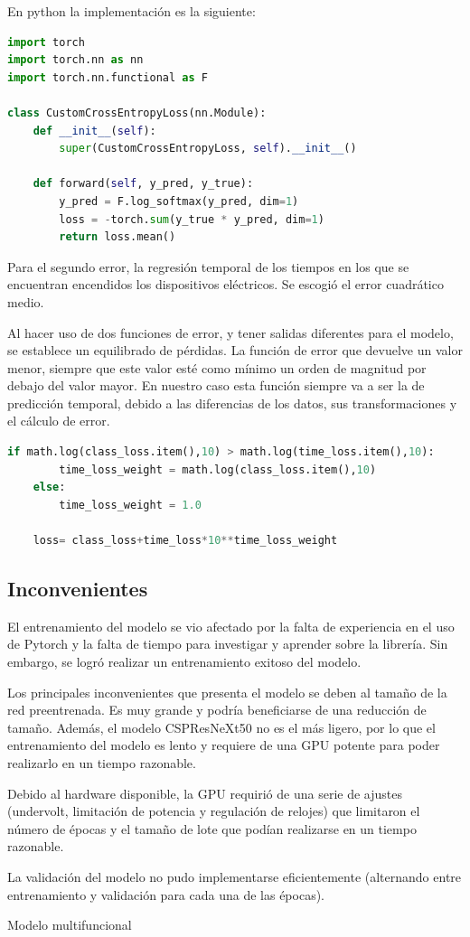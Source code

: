 En python la implementación es la siguiente: 
\begin{lstlisting}[language=python]
import torch
import torch.nn as nn
import torch.nn.functional as F

class CustomCrossEntropyLoss(nn.Module):
    def __init__(self):
        super(CustomCrossEntropyLoss, self).__init__()
    
    def forward(self, y_pred, y_true):
        y_pred = F.log_softmax(y_pred, dim=1)
        loss = -torch.sum(y_true * y_pred, dim=1)
        return loss.mean()
\end{lstlisting}

Para el segundo error, la regresión temporal de los tiempos en los que se encuentran encendidos los dispositivos eléctricos. Se escogió el error cuadrático medio.

Al hacer uso de dos funciones de error, y tener salidas diferentes para el modelo, se establece un equilibrado de pérdidas. La función de error que devuelve un valor menor, siempre que este valor esté como mínimo un orden de magnitud por debajo del valor mayor. En nuestro caso esta función siempre va a ser la de predicción temporal, debido a las diferencias de los datos, sus transformaciones y el cálculo de error.
\begin{lstlisting}[language=python]
    if math.log(class_loss.item(),10) > math.log(time_loss.item(),10):
        time_loss_weight = math.log(class_loss.item(),10)
    else:
        time_loss_weight = 1.0
    
    loss= class_loss+time_loss*10**time_loss_weight
\end{lstlisting}


\subsection{Inconvenientes}
El entrenamiento del modelo se vio afectado por la falta de experiencia en el uso de Pytorch y la falta de tiempo para investigar y aprender sobre la librería. Sin embargo, se logró realizar un entrenamiento exitoso del modelo.

Los principales inconvenientes que presenta el modelo se deben al tamaño de la red preentrenada. Es muy grande y podría beneficiarse de una reducción de tamaño. Además, el modelo CSPResNeXt50 no es el más ligero, por lo que el entrenamiento del modelo es lento y requiere de una GPU potente para poder realizarlo en un tiempo razonable.

Debido al hardware disponible, la GPU requirió de una serie de ajustes (undervolt, limitación de potencia y regulación de relojes) que limitaron el número de épocas y el tamaño de lote que podían realizarse en un tiempo razonable.

La validación del modelo no pudo implementarse eficientemente (alternando entre entrenamiento y validación para cada una de las épocas).


Modelo multifuncional
